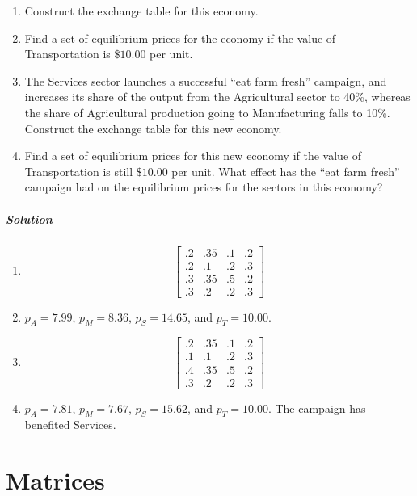 \documentclass[oneside]{book} %
\theoremstyle{plain}
\begin{document}
\begin{enumerate}
\item Construct the exchange table for this economy.
\item Find a set of equilibrium prices for the economy if the value of
Transportation is $\$10.00$ per unit.
\item {The Services sector launches a successful ``eat farm fresh'' campaign,
       and increases its share of the output from the Agricultural sector to
40\%,
       whereas the share of Agricultural production going to Manufacturing falls
to 10\%.
       Construct the exchange table for this new economy.}
\item {Find a set of equilibrium prices for this new economy if the value of
Transportation is still $\$10.00$ per unit.
       What effect has the ``eat farm fresh'' campaign had on the equilibrium
prices for the sectors in this economy?}
\end{enumerate}

\subparagraph{Solution}

\begin{enumerate}
\item {$$ \begin{bmatrix}
.2 & .35 & .1 & .2 \\
.2 &  .1 & .2 & .3 \\
.3 & .35 & .5 & .2 \\
.3 &  .2 & .2 & .3 \end{bmatrix} $$}
\item{$p_A = 7.99$, $p_M = 8.36$, $p_S = 14.65$, and $p_T = 10.00$.}
\item {$$ \begin{bmatrix}
.2 & .35 & .1 & .2 \\
.1 &  .1 & .2 & .3 \\
.4 & .35 & .5 & .2 \\
.3 &  .2 & .2 & .3 \end{bmatrix} $$}
\item{$p_A = 7.81$, $p_M = 7.67$, $p_S = 15.62$, and $p_T = 10.00$.
      The campaign has benefited Services.}
\end{enumerate}



\section{Matrices}
\end{document}
